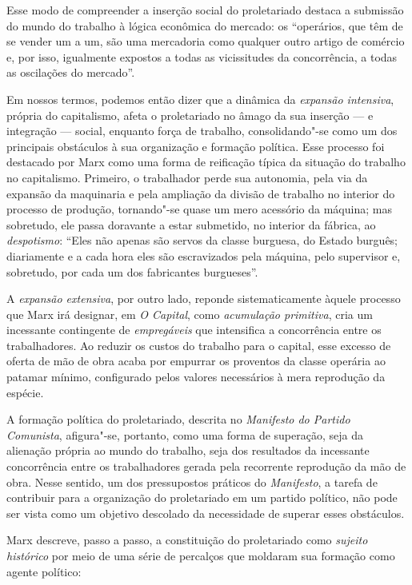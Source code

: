 Esse modo de compreender a inserção social do proletariado destaca a
submissão do mundo do trabalho à lógica econômica do mercado: os
``operários, que têm de se vender um a um, são uma mercadoria como
qualquer outro artigo de comércio e, por isso, igualmente expostos a
todas as vicissitudes da concorrência, a todas as oscilações do
mercado''.

Em nossos termos, podemos então dizer que a dinâmica da \textit{expansão
intensiva}, própria do capitalismo, afeta o proletariado no âmago da sua
inserção --- e integração --- social, enquanto força de trabalho,
consolidando"-se como um dos principais obstáculos à sua organização e
formação política. Esse processo foi destacado por Marx como uma forma
de reificação típica da situação do trabalho no capitalismo. Primeiro,
o trabalhador perde sua autonomia, pela via da expansão da maquinaria e
pela ampliação da divisão de trabalho no interior do processo de
produção, tornando"-se quase um mero acessório da máquina; mas
sobretudo, ele passa doravante a estar submetido, no interior da
fábrica, ao \textit{despotismo}: ``Eles não apenas são servos da classe
burguesa, do Estado burguês; diariamente e a cada hora eles são
escravizados pela máquina, pelo supervisor e, sobretudo, por cada um
dos fabricantes burgueses''.

A \textit{expansão extensiva}, por outro lado, reponde sistematicamente àquele
processo que Marx irá designar, em \textit{O Capital}, como \textit{acumulação
primitiva}, cria um incessante contingente de \textit{empregáveis} que
intensifica a concorrência entre os trabalhadores. Ao reduzir os custos
do trabalho para o capital, esse excesso de oferta de mão de obra
acaba por empurrar os proventos da classe operária ao patamar mínimo,
configurado pelos valores necessários à mera reprodução da espécie.

A formação política do proletariado, descrita no \textit{Manifesto do
Partido Comunista}, afigura"-se, portanto, como uma forma de superação,
seja da alienação própria ao mundo do trabalho, seja dos resultados da
incessante concorrência entre os trabalhadores gerada pela recorrente
reprodução da mão de obra. Nesse sentido, um dos pressupostos
práticos do \textit{Manifesto}, a tarefa de contribuir para a
organização do proletariado em um partido político, não pode ser vista
como um objetivo descolado da necessidade de superar esses obstáculos.

Marx descreve, passo a passo, a constituição do proletariado como
\textit{sujeito histórico} por meio de uma série de percalços que moldaram sua
formação como agente político: 

